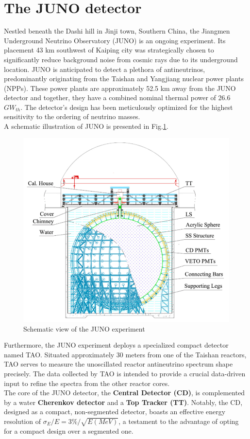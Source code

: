 \section{The JUNO detector}

Nestled beneath the Dashi hill in Jinji town, Southern China, the Jiangmen Underground Neutrino Observatory (JUNO) is an ongoing experiment. Its placement 43 km southwest of Kaiping city was strategically chosen to significantly reduce background noise from cosmic rays due to its underground location. JUNO is anticipated to detect a plethora of antineutrinos, predominantly originating from the Taishan and Yangjiang nuclear power plants (NPPs). These power plants are approximately 52.5 km away from the JUNO detector and together, they have a combined nominal thermal power of 26.6 $GW_{th}$. The detector's design has been meticulously optimized for the highest sensitivity to the ordering of neutrino masses.\\

A schematic illustration of JUNO is presented in Fig.\ref{fig:junoschemeexperiment}.


\begin{figure}[h]
	\centering
	\includegraphics[width=0.6\linewidth]{Images/juno_scheme_experiment}
	\caption[JUNO scheme experiment]{Schematic view of the JUNO experiment}
	\label{fig:junoschemeexperiment}
\end{figure}


Furthermore, the JUNO experiment deploys a specialized compact detector named TAO. Situated approximately 30 meters from one of the Taishan reactors, TAO serves to measure the unoscillated reactor antineutrino spectrum shape precisely. The data collected by TAO is intended to provide a crucial data-driven input to refine the spectra from the other reactor cores. \\
The core of the JUNO detector, the \textbf{Central Detector (CD)}, is complemented by a water \textbf{Cherenkov detector} and a \textbf{Top Tracker (TT)}. Notably, the CD, designed as a compact, non-segmented detector, boasts an effective energy resolution of $\sigma_E/E =3\% / \sqrt{E (MeV)}$, a testament to the advantage of opting for a compact design over a segmented one.\\

